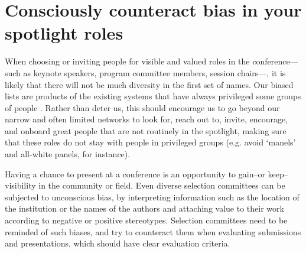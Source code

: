 \documentclass[10pt,letterpaper]{article}
\begin{document}


\section{Consciously counteract bias in your spotlight roles}
\label{rule_unbias}


When choosing or inviting people for visible and valued roles in the conference––such as keynote speakers, program committee members, session chairs––, it is likely that there will not be much diversity in the first set of names.
Our biased lists are products of the existing systems that have always privileged some groups of people \cite{dwyerNoticeWhoScience2021,swartzScienceValueDiversity2019,wongBuildDiversityScience2020,dignazioUnicornsJanitorsNinjas2020}. 
Rather than deter us, this should encourage us to go beyond our narrow and often limited networks to look for, reach out to, invite, encourage, and onboard great people that are not routinely in the spotlight, making sure that these roles do not stay with people in privileged groups (e.g. avoid `manels' and all-white panels, for instance).

Having a chance to present at a conference is an opportunity to gain--or keep--visibility in the community or field. 
Even diverse selection committees can be subjected to unconscious bias, by interpreting information such as the location of the institution or the names of the authors and attaching value to their work according to negative or positive stereotypes. 
Selection committees need to be reminded of such biases, and try to counteract them when evaluating submissions and presentations, which should have clear evaluation criteria.
\cite{swartzScienceValueDiversity2019, wongBuildDiversityScience2020}
 
\end{document}
